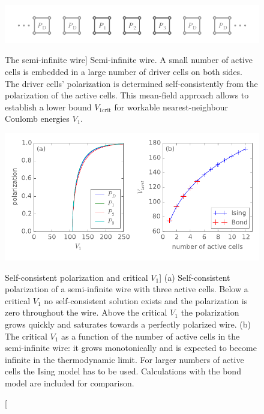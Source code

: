\begin{figure}
  \center
  \includegraphics{semi_infinite_wire}
  \caption
  [The semi-infinite wire]
  {
  \label{fig:semi_infinite_wire}
  Semi-infinite wire. A small number of active cells is embedded in a large
  number of driver cells on both sides. The driver cells' polarization is
  determined self-consistently from the polarization of the active cells. This
  mean-field approach allows to establish a lower bound $V_{1\textrm{crit}}$ for workable
  nearest-neighbour Coulomb energies $V_1$.
  }
  
  \vspace*{0.75cm}
  
  \includegraphics{critical_V1}
  \caption
  [Self-consistent polarization and critical $V_1$]
  {
  \label{fig:critical_V1}
  (a) Self-consistent polarization of a semi-infinite wire with three active cells.
  Below a critical $V_1$ no self-consistent solution exists and the polarization
  is zero throughout the wire. Above the critical $V_1$ the polarization grows
  quickly and saturates towards a perfectly polarized wire.
  (b) The critical $V_1$ as a function of the number of active cells in the
  semi-infinite wire: it grows monotonically and is expected to become infinite
  in the thermodynamic limit. For larger numbers of active cells the Ising model
  has to be used. Calculations with the bond model are included for comparison.
  }
\end{figure}

